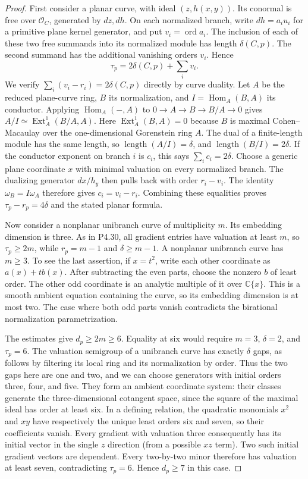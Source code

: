 \begin{proof}
First consider a planar curve, with ideal $(z,h(x,y))$.
Its conormal is free over $\mathcal O_C$, generated by
$dz,dh$. On each normalized branch, write
$dh=a_i u_i$ for a primitive plane kernel generator,
and put $v_i=\operatorname{ord}a_i$.
The inclusion of each of these two free summands into
its normalized module has length $\delta(C,p)$.
The second summand has the additional vanishing orders
$v_i$. Hence
\[
 \tau_p=2\delta(C,p)+\sum_i v_i.
\]
We verify $\sum_i(v_i-r_i)=2\delta(C,p)$ directly by
curve duality. Let $A$ be the reduced plane-curve ring,
$B$ its normalization, and $I=\operatorname{Hom}_A(B,A)$
its conductor. Applying $\operatorname{Hom}_A(-,A)$ to
$0\to A\to B\to B/A\to0$ gives
$A/I\simeq\operatorname{Ext}^1_A(B/A,A)$.
Here $\operatorname{Ext}^1_A(B,A)=0$ because $B$ is
maximal Cohen--Macaulay over the one-dimensional
Gorenstein ring $A$. The dual of a finite-length module
has the same length, so $\operatorname{length}(A/I)=\delta$,
and $\operatorname{length}(B/I)=2\delta$.
If the conductor exponent on branch $i$ is $c_i$,
this says $\sum_i c_i=2\delta$.
Choose a generic plane coordinate $x$ with minimal
valuation on every normalized branch. The dualizing
generator $dx/h_y$ then pulls back with
order $r_i-v_i$. The identity
$\omega_B=I\omega_A$ therefore gives
$c_i=v_i-r_i$. Combining these equalities proves
$\tau_p-r_p=4\delta$ and the stated planar formula.

Now consider a nonplanar unibranch curve of multiplicity
$m$. Its embedding dimension is three. As in P4.30,
all gradient entries have valuation at least $m$, so
$\tau_p\ge2m$, while $r_p=m-1$ and
$\delta\ge m-1$. A nonplanar unibranch curve has
$m\ge3$. To see the last assertion, if $x=t^2$, write
each other coordinate as $a(x)+t b(x)$. After subtracting
the even parts, choose the nonzero $b$ of least order.
The other odd coordinate is an analytic multiple of it
over $\mathbb C\{x\}$. This is a smooth ambient equation
containing the curve, so its embedding dimension is at
most two. The case where both odd parts vanish contradicts
the birational normalization parametrization.

The estimates give $d_p\ge2m\ge6$. Equality at six
would require $m=3$, $\delta=2$, and $\tau_p=6$.
The valuation semigroup of a unibranch curve has exactly
$\delta$ gaps, as follows by filtering its local ring
and its normalization by order. Thus the two gaps here
are one and two, and we can choose generators with
initial orders three, four, and five. They form an
ambient coordinate system: their classes generate the
three-dimensional cotangent space, since the square
of the maximal ideal has order at least six.
In a defining relation, the quadratic monomials
$x^2$ and $xy$ have respectively the unique least
orders six and seven, so their coefficients vanish.
Every gradient with valuation three consequently has
its initial vector in the single $z$ direction
(from a possible $xz$ term). Two such initial
gradient vectors are dependent. Every two-by-two
minor therefore has valuation at least seven,
contradicting $\tau_p=6$. Hence $d_p\ge7$ in this case.


\end{proof}
